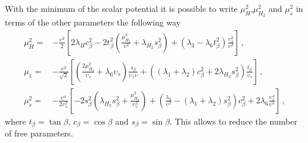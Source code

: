 \documentclass[12pt]{article}
\begin{document}
With the minimum of the scalar potential it is possible to write $\mu_{H}^{2}$,$\mu_{H_{2}}^{2}$ and $\mu^{2}_{s}$ in terms of the other parameters the following way
%
\begin{align*}
    \mu^{2}_{H} =& -\frac{\upsilon^{2}}{2}\left[ 2 \lambda_{H} c^{2}_{\beta} - 2 t^{2}_{\beta} \left(\frac{\mu^{2}_{H_{2}}}{\upsilon^{2}}+\lambda_{H_{2}} s^{2}_{\beta} \right) + \left( \lambda_{3} - \lambda_{6} t^{2}_{\beta} \right) \frac{\upsilon^{2}_{s}}{\upsilon^{2}} \right]\,, \\
    \mu_{1} =& -\frac{\upsilon^{2}}{\sqrt{2}} \left[ \left( \frac{2\mu^{2}_{H_{2}}}{\upsilon_{s}} + \lambda_{6} \upsilon_{s} \right) \frac{s_{\beta}}{\upsilon_{1} \upsilon} + \left( (\lambda_{1}+\lambda_{2})c^{2}_{\beta} + 2 \lambda_{H_{2}} s^{2}_{\beta} \right) \frac{t_{\beta}}{\upsilon_{s}} \right]\,, \\
   \mu^{2}_{s} =& -\frac{\upsilon^{4}}{2 \upsilon^{2}_{s}} \left[ -2s^{2}_{\beta} \left( \lambda_{H_{2}} s^{2}_{\beta} + \frac{\mu^{2}_{H_{2}}}{\upsilon^{2}_{s}}\right) + \left( \frac{\lambda_{3}}{\upsilon^{2}} - (\lambda_{1}+\lambda_{2})s^{2}_{\beta} \right) c^{2}_{\beta} + 2 \lambda_{6} \frac{\upsilon^{4}_{s}}{\upsilon^{4}} \right]\,,
\end{align*}
%
where $t_{\beta} = \tan \beta$, $c_{\beta} = \cos \beta$ and $s_{\beta} = \sin \beta$. This allows to reduce the number of free parameters.
\end{document}
